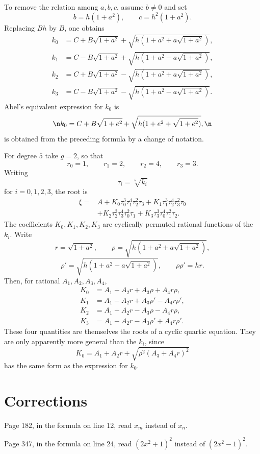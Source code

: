 \documentclass[11pt]{article}
\begin{document}
To remove the relation among $a,b,c$, assume $b\ne0$ and set
\begin{equation}
  b=h(1+a^2),\qquad c=h^2(1+a^2).
\end{equation}
Replacing $Bh$ by $B$, one obtains
\begin{equation}
\begin{aligned}
 k_0&=C+B\sqrt{1+a^2}+\sqrt{h(1+a^2+a\sqrt{1+a^2})},\\
 k_1&=C-B\sqrt{1+a^2}+\sqrt{h(1+a^2-a\sqrt{1+a^2})},\\
 k_2&=C+B\sqrt{1+a^2}-\sqrt{h(1+a^2+a\sqrt{1+a^2})},\\
 k_3&=C-B\sqrt{1+a^2}-\sqrt{h(1+a^2-a\sqrt{1+a^2})}.
\end{aligned}
\end{equation}
Abel's equivalent expression for $k_0$ is\n\[\n  k_0=C+B\sqrt{1+e^2}+\sqrt{h(1+e^2+\sqrt{1+e^2})},\n\]\nand is obtained from the preceding formula by a change of notation.

For degree $5$ take $g=2$, so that
\[
  r_0=1,\qquad r_1=2,
  \qquad r_2=4,
  \qquad r_3=3.
\]
Writing
\[
  \tau_i=\sqrt[5]{k_i}
\]
for $i=0,1,2,3$, the root is
\begin{equation}
\begin{aligned}
 \xi={}&A+K_0\tau_0^3\tau_1^4\tau_2^2\tau_3
       +K_1\tau_1^3\tau_2^4\tau_3^2\tau_0\\
      &+K_2\tau_2^3\tau_3^4\tau_0^2\tau_1
       +K_3\tau_3^3\tau_0^4\tau_1^2\tau_2.
\end{aligned}
\end{equation}
The coefficients $K_0,K_1,K_2,K_3$ are cyclically permuted rational functions of the $k_i$. Write
\begin{equation}
  r=\sqrt{1+a^2},\qquad
  \rho=\sqrt{h(1+a^2+a\sqrt{1+a^2})},
\end{equation}
\begin{equation}
  \rho'=\sqrt{h(1+a^2-a\sqrt{1+a^2})},
  \qquad \rho\rho'=hr.
\end{equation}
Then, for rational $A_1,A_2,A_3,A_4$,
\begin{equation}
\begin{aligned}
 K_0&=A_1+A_2r+A_3\rho+A_4r\rho,\\
 K_1&=A_1-A_2r+A_3\rho'-A_4r\rho',\\
 K_2&=A_1+A_2r-A_3\rho-A_4r\rho,\\
 K_3&=A_1-A_2r-A_3\rho'+A_4r\rho'.
\end{aligned}
\end{equation}
These four quantities are themselves the roots of a cyclic quartic equation. They are only apparently more general than the $k_i$, since
\[
  K_0=A_1+A_2r+\sqrt{\rho^2(A_3+A_4r)^2}
\]
has the same form as the expression for $k_0$.

\section*{Corrections}

Page 182, in the formula on line 12, read $x_m$ instead of $x_n$.

Page 347, in the formula on line 24, read $(2x^2+1)^2$ instead of $(2x^2-1)^2$.
\end{document}
